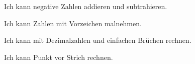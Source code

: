 \setcounter{aufgabe}{0}


\begin{kbaufgabe}{Ich kann negative Zahlen addieren und subtrahieren.}
\begin{kbblock}
\end{kbblock}
\begin{kbblock}
\item[]
\end{kbblock}
\end{kbaufgabe}


\begin{kbaufgabe}{Ich kann Zahlen mit Vorzeichen malnehmen.}
\begin{kbblock}
\end{kbblock}
\begin{kbblock}
\item[]
\end{kbblock}
\end{kbaufgabe}


\begin{kbaufgabe}{Ich kann mit Dezimalzahlen und einfachen Brüchen rechnen.}
\begin{kbblock}
\end{kbblock}
\begin{kbblock}
\item[]
\end{kbblock}
\end{kbaufgabe}


\begin{kbaufgabe}{Ich kann Punkt vor Strich rechnen.}
\begin{kbblock}
\end{kbblock}
\begin{kbblock}
\item[]
\end{kbblock}
\end{kbaufgabe}


